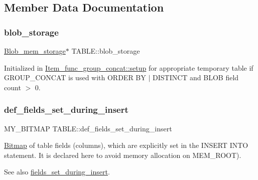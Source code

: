 \subsection{Member Data Documentation}
\mbox{\label{structTABLE_ae97224c2b47679281629de05a4155a71}} 
\subsubsection{\texorpdfstring{blob\+\_\+storage}{blob\_storage}}
{\footnotesize\ttfamily \mbox{\hyperlink{classBlob__mem__storage}{Blob\+\_\+mem\+\_\+storage}}$\ast$ T\+A\+B\+L\+E\+::blob\+\_\+storage}

Initialized in \mbox{\hyperlink{classItem__func__group__concat_a5c268b187518bc006184424a74a5113b}{Item\+\_\+func\+\_\+group\+\_\+concat\+::setup}} for appropriate temporary table if G\+R\+O\+U\+P\+\_\+\+C\+O\+N\+C\+AT is used with O\+R\+D\+ER BY $\vert$ D\+I\+S\+T\+I\+N\+CT and B\+L\+OB field count $>$ 0. \mbox{\label{structTABLE_adc4c495f334d7d4f3822800df766f246}} 
\subsubsection{\texorpdfstring{def\+\_\+fields\+\_\+set\+\_\+during\+\_\+insert}{def\_fields\_set\_during\_insert}}
{\footnotesize\ttfamily M\+Y\+\_\+\+B\+I\+T\+M\+AP T\+A\+B\+L\+E\+::def\+\_\+fields\+\_\+set\+\_\+during\+\_\+insert}

\mbox{\hyperlink{classBitmap}{Bitmap}} of table fields (columns), which are explicitly set in the I\+N\+S\+E\+RT I\+N\+TO statement. It is declared here to avoid memory allocation on M\+E\+M\+\_\+\+R\+O\+OT).

\begin{DoxySeeAlso}{See also}
\mbox{\hyperlink{structTABLE_a409fb1cb388b91a9bccf07d9e5cea8c6}{fields\+\_\+set\+\_\+during\+\_\+insert}}. 
\end{DoxySeeAlso}
\mbox{\label{structTABLE_a409fb1cb388b91a9bccf07d9e5cea8c6}} 
